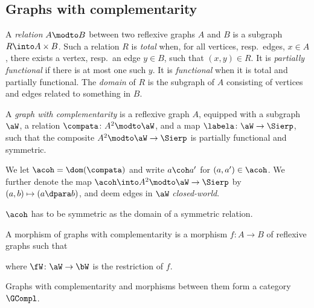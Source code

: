 \documentclass{LMCS}
\theoremstyle{plain}\newtheorem{satz}[thm]{Satz}
\begin{document}
\subsection{Graphs with complementarity}
A \emph{relation} $A \modto B$ between two reflexive graphs $A$ and
$B$ is a subgraph $R \into A \times B$. Such a relation $R$ is
\emph{total} when, for all vertices, resp.\ edges, $x \in A$, there
exists a vertex, resp.\ an edge $y \in B$, such that $(x,y) \in R$. It
is \emph{partially functional} if there is at most one such $y$.  It is
\emph{functional} when it is total and partially functional.  The
\emph{domain} of $R$ is the subgraph of $A$ consisting of vertices and
edges related to something in $B$.
\begin{defi}
  A \emph{graph with complementarity} is a reflexive graph $A$,
  equipped with a subgraph $\aW$, a relation $\compata \colon A^2
  \modto \aW$, and a map $\labela \colon \aW \to \Sierp$, such that
  the composite $A^2 \modto \aW \to \Sierp$ is partially functional
  and symmetric.
\end{defi}
We let $\acoh = \dom(\compata)$ and write $a \coh a'$ for $(a,a') \in
\acoh$. We further denote the map $\acoh \into A^2 \modto \aW \to
\Sierp$ by $(a,b) \mapsto (a \dpara b)$, and deem edges in $\aW$
\emph{closed-world}.

\begin{rem}
  $\acoh$ has to be symmetric as the domain of a symmetric relation.
\end{rem}

\begin{defi}
  A morphism of graphs with complementarity is a morphism $f \colon A
  \to B$ of reflexive graphs such that
  where $\fW \colon \aW \to \bW$ is the restriction of $f$.
\end{defi}

\begin{prop}
  Graphs with complementarity and morphisms between them form a category $\GCompl$.
\end{prop}
\end{document}

